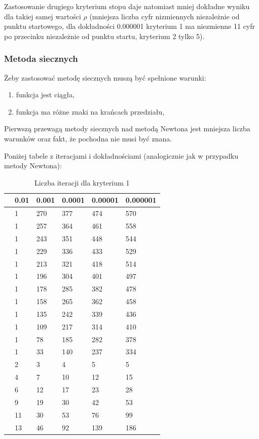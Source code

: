 \documentclass{article}
\begin{document}
Zastosowanie drugiego kryterium stopu daje natomiast mniej dokładne wyniku dla takiej samej wartości $\rho$
(mniejsza liczba cyfr nizmiennych niezależnie od punktu startowego, dla dokładności 0.000001 kryterium 1 ma niezmienne 11 cyfr po przecinku 
niezależnie od punktu startu, kryterium 2 tylko 5).

\subsubsection{Metoda siecznych}
Żeby zastosować metodę siecznych muszą być spełnione warunki:
\begin{enumerate}
    \item
    funkcja jest ciągła,
    \item
    funkcja ma różne znaki na krańcach przedziału,
\end{enumerate}

Pierwszą przewagą metody siecznych nad metodą Newtona jest mniejsza liczba warunków oraz fakt, że pochodna nie musi być znana.

Poniżej tabele z iteracjami i dokładnościami (analogicznie jak w przypadku metody Newtona):

\begin{table}[H]
\centering
\begin{tabular}{|l|l|l|l|l|l|}
\hline
& 0.01 & 0.001 & 0.0001 & 0.00001 & 0.000001 \\ \hline
[0.10, 1.90] & 1 & 270 & 377 & 474 & 570 \\ \hline
[0.10, 1.80] & 1 & 257 & 364 & 461 & 558 \\ \hline
[0.10, 1.70] & 1 & 243 & 351 & 448 & 544 \\ \hline
[0.10, 1.60] & 1 & 229 & 336 & 433 & 529 \\ \hline
[0.10, 1.50] & 1 & 213 & 321 & 418 & 514 \\ \hline
[0.10, 1.40] & 1 & 196 & 304 & 401 & 497 \\ \hline
[0.10, 1.30] & 1 & 178 & 285 & 382 & 478 \\ \hline
[0.10, 1.20] & 1 & 158 & 265 & 362 & 458 \\ \hline
[0.10, 1.10] & 1 & 135 & 242 & 339 & 436 \\ \hline
[0.10, 1.00] & 1 & 109 & 217 & 314 & 410 \\ \hline
[0.10, 0.90] & 1 & 78 & 185 & 282 & 378 \\ \hline
[0.10, 0.80] & 1 & 33 & 140 & 237 & 334 \\ \hline
[0.10, 0.70] & 2 & 3 & 4 & 5 & 5 \\ \hline
[0.10, 0.60] & 4 & 7 & 10 & 12 & 15 \\ \hline
[0.10, 0.50] & 6 & 12 & 17 & 23 & 28 \\ \hline
[0.10, 0.40] & 9 & 19 & 30 & 42 & 53 \\ \hline
[0.10, 0.30] & 11 & 30 & 53 & 76 & 99 \\ \hline
[0.10, 0.20] & 13 & 46 & 92 & 139 & 186 \\ \hline
\end{tabular}
\caption{Liczba iteracji dla kryterium 1}
\end{table}
\end{document}
